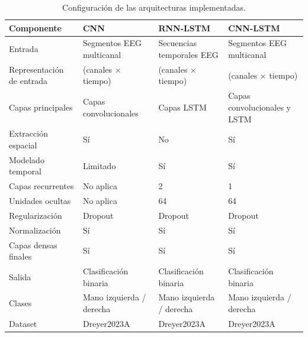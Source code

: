 \begin{table}[htbp]
\centering
\caption{Configuración de las arquitecturas implementadas.}
\label{tab:modelos}

\begin{tabular}{L{3cm}L{3cm}L{3cm}L{3cm}}
\toprule
\textbf{Componente} & \textbf{CNN} & \textbf{RNN-LSTM} & \textbf{CNN-LSTM} \\
    \midrule

    Entrada &
    Segmentos EEG multicanal &
    Secuencias temporales EEG &
    Segmentos EEG multicanal \\

    Representación de entrada &
    (canales $\times$ tiempo) &
    (canales $\times$ tiempo) &
    (canales $\times$ tiempo) \\

    Capas principales &
    Capas convolucionales &
    Capas LSTM &
    Capas convolucionales y LSTM \\

    Extracción espacial &
    Sí &
    No &
    Sí \\ 

    Modelado temporal &
    Limitado &
    Sí &
    Sí \\ 

    Capas recurrentes &
    No aplica &
    2 &
    1 \\ 

    Unidades ocultas &
    No aplica &
    64 &
    64 \\ 

    Regularización &
    Dropout &
    Dropout &
    Dropout \\ 

    Normalización &
    Sí &
    Sí &
    Sí \\ 

    Capas densas finales &
    Sí &
    Sí &
    Sí \\ 

    Salida &
    Clasificación binaria &
    Clasificación binaria &
    Clasificación binaria \\ 

    Clases &
    Mano izquierda / derecha &
    Mano izquierda / derecha &
    Mano izquierda / derecha \\ 

    Dataset &
    Dreyer2023A &
    Dreyer2023A &
    Dreyer2023A \\ 

\end{tabular}
\end{table}

